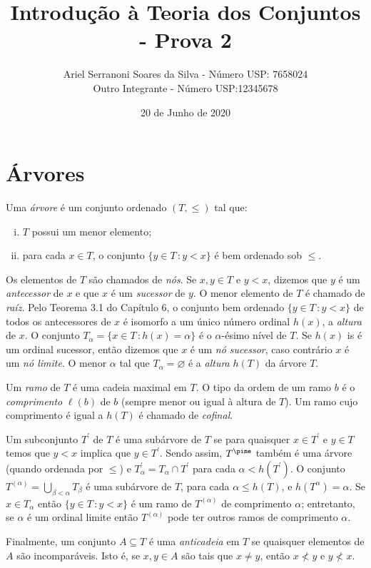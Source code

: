 \documentclass[a4paper]{article}
\title{Introdução à Teoria dos Conjuntos - Prova 2}
\author{Ariel Serranoni Soares da Silva  - Número USP: 7658024\\
Outro Integrante - Número USP:12345678}
\date{20 de Junho de 2020}
\begin{document}
\maketitle
\setcounter{section}{2}
\section{Árvores}

\begin{definition}
  Uma \emph{árvore} é um conjunto ordenado \((T,\leq)\) tal que:
  \begin{enumerate}[(i)]
  \item \(T\) possui um menor elemento;
  \item para cada \(x\in T\), o conjunto \(\{y\in T\,\colon y<x\}\) é bem
    ordenado sob \(\leq\).
  \end{enumerate}
\end{definition}

Os elementos de \(T\) são chamados de \emph{nós}. Se \(x,y\in T\) e \(y<x\),
dizemos que \(y\) é um \emph{antecessor} de \(x\) e que \(x\) é um
\emph{sucessor} de \(y\). O menor elemento de \(T\) é chamado de \emph{raíz}.
Pelo Teorema 3.1 do Capítulo 6, o conjunto bem ordenado \(\{y\in T\,\colon
y<x\}\) de todos os antecessores de \(x\) é isomorfo a um único número ordinal
\(h(x)\), a \emph{altura} de \(x\). O conjunto \(T_\alpha=\{x\in T \,\colon
h(x)=\alpha\}\) é o \(\alpha\)-ésimo nível de \(T\). Se \(h(x)\) is é um ordinal
sucessor, então dizemos que \(x\) é um \emph{nó sucessor}, caso contrário
\(x\) é um \emph{nó limite}. O menor \(\alpha\) tal que \(T_\alpha=\varnothing\)
é a \emph{altura} \(h(T)\) da árvore \(T\). 


Um \emph{ramo} de \(T\) é uma cadeia maximal em \(T\). O tipo da ordem
de um ramo \(b\) é o \emph{comprimento} \(\ell(b)\) de \(b\) (sempre menor ou
igual à altura de \(T\)). Um ramo cujo comprimento é igual a \(h(T)\) é chamado
de \emph{cofinal}.

Um subconjunto \(T^\prime\) de \(T\) é uma subárvore de \(T\) se para quaisquer
\(x\in T^\prime\) e \(y\in T\) temos que \(y<x\) implica que \(y\in T^\prime\).
Sendo assim, \(T^\pime\) também é uma árvore (quando ordenada por \(\leq\)) e
\(T_\alpha^\prime= T_\alpha \cap T^\prime\) para cada \(\alpha < h(T^\prime)\).
O conjunto \(T^{(\alpha)}=\bigcup_{\beta < \alpha} T_\beta\) é uma subárvore de
\(T\), para cada \(\alpha\leq h(T)\), e \(h(T^{\alpha})=\alpha\). Se \(x\in
T_\alpha\) então \(\{y\in T\,\colon y < x\}\) é um ramo de \(T^{(\alpha)}\) de
comprimento \(\alpha\); entretanto, se \(\alpha\) é um ordinal limite então
\(T^{(\alpha)}\) pode ter outros ramos de comprimento \(\alpha\).

Finalmente, um conjunto \(A\subseteq T\) é uma \emph{anticadeia} em \(T\) se
quaisquer elementos de \(A\) são incomparáveis. Isto é, se \(x,y\in A\) são tais
que \(x\not = y\), então \(x\not < y\) e \(y\not < x\).

  
\end{document}
